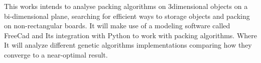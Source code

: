This works intends to analyse packing algorithms on 3dimensional objects on a bi-dimensional plane, searching for efficient ways to storage objects and packing on non-rectangular boards.
It will make use of a modeling software called FreeCad and Its integration with Python to work with packing algorithms.
Where It will analyze different genetic algorithms implementations comparing how they converge to a near-optimal result.